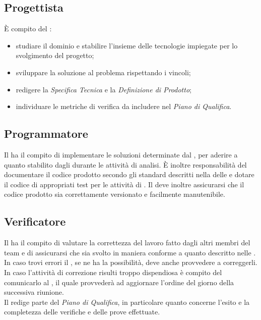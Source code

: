 \subsection{Progettista}
\`{E} compito del \Progettista:
\begin{itemize}
	\item studiare il dominio e stabilire l'insieme delle tecnologie impiegate per lo svolgimento del progetto;
	\item sviluppare la soluzione al problema rispettando i vincoli;
	\item redigere la \textit{Specifica Tecnica} e la \textit{Definizione di Prodotto};
	\item individuare le metriche di verifica da includere nel \textit{Piano di Qualifica}.
\end{itemize}

\subsection{Programmatore}
Il \Programmatore{} ha il compito di implementare le soluzioni determinate dal \Progettista, per aderire a quanto stabilito dagli \Analisti{} durante le attività di analisi. \`{E} inoltre responsabilità del \Programmatore{} documentare il codice prodotto secondo gli standard descritti nella  delle \NormeDiProgetto{} e dotare il codice di appropriati test per le attività di \VV. Il \Programmatore{} deve inoltre assicurarsi che il codice prodotto sia correttamente versionato e facilmente manutenibile.

\subsection{Verificatore}
Il \Verificatore{} ha il compito di valutare la correttezza del lavoro fatto dagli altri membri del team e di assicurarsi che sia svolto in maniera conforme a quanto descritto nelle \NormeDiProgetto. In caso trovi errori il \Verificatore, se ne ha la possibilità, deve anche provvedere a correggerli. In caso l'attività di correzione risulti troppo dispendiosa è compito del \Verificatore{} comunicarlo al \Responsabile, il quale provvederà ad aggiornare l'ordine del giorno della successiva riunione.\\
Il \Verificatore{} redige parte del \textit{Piano di Qualifica}, in particolare quanto concerne l'esito e la completezza delle verifiche e delle prove effettuate.
